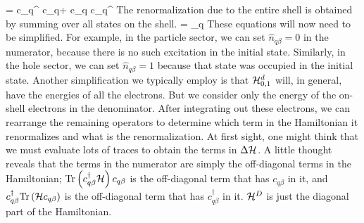 \documentclass[12pt,twoside]{article}
\numberwithin{equation}{section}
\begin{document}
\beq
\Delta \ham = c_{q\beta}^\dagger {}  c_{q\beta}+  c_{q\beta} c_{q\beta}^\dagger{}
\eeq
The renormalization due to the entire shell is obtained by summing over all states on the shell.
\beq[delta]
\Delta \ham = \sum_{q\beta} 
\eeq
These equations will now need to be simplified. For example, in the particle sector, we can set \(\hat n_{q\beta}=0\) in the numerator, because there is no such excitation in the initial state. Similarly, in  the hole sector, we can set \(\hat n_{q\beta}=1\) because that state was occupied in the initial state. Another simplification we typically employ is that \(\mathcal{H}^d_{0,1}\) will, in general, have the energies of all the electrons. But we consider only the energy of the on-shell electrons in the denominator. After integrating out these electrons, we can rearrange the remaining operators to determine which term in the Hamiltonian it renormalizes and what is the renormalization.
\pb At first sight, one might think that we must evaluate lots of traces to obtain the terms in \(\Delta \mathcal{H}\). A little thought reveals that the terms in the numerator are simply the off-diagonal terms in the Hamiltonian; \(\text{Tr}\left({c^\dagger_{q\beta}\mathcal{H} }\right)c_{q\beta}\) is the off-diagonal term that has \(c_{q\beta}\) in it, and \(c_{q\beta}^\dagger \text{Tr}\left({\mathcal{H} c_{q\beta}}\right)\) is the off-diagonal term that has \(c^\dagger_{q\beta}\) in it. \(\mathcal{H}^D\) is just the diagonal part of the Hamiltonian.
\end{document}
